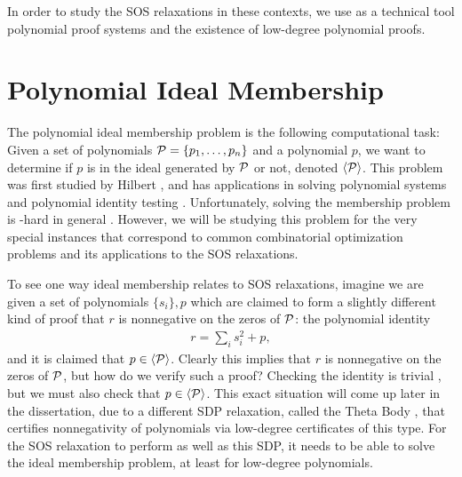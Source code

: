 In order to study the SOS relaxations in these contexts, we use as a technical tool polynomial proof systems and the existence of low-degree polynomial proofs.

\section{Polynomial Ideal Membership}

The polynomial ideal membership problem is the following computational task:
Given a set of polynomials $\mathcal P = \{p_1,\dots,p_n\}$ and a polynomial $p$, we want to determine if $p$ is in the ideal generated by $\mathcal P$ or not, denoted $\langle \mathcal P \rangle$.
This problem was first studied by Hilbert \cite{Hilbert1893}, and has applications in solving polynomial systems \cite{CLO07} and polynomial identity testing \cite{AM10}.
Unfortunately, solving the membership problem is \expspace-hard in general \cite{MM82,Huynh1985}.
However, we will be studying this problem for the very special instances that correspond to common combinatorial optimization problems and its applications to the SOS relaxations.

To see one way ideal membership relates to SOS relaxations, imagine we are given a set of polynomials $\{s_i\}, p$ which are claimed to form a slightly different kind of proof  that $r$ is nonnegative on the zeros of $\mathcal P$: the polynomial identity
\begin{align}
r = \sum_i s_i^2 + p,
\end{align}
and it is claimed that $p \in \langle \mathcal P \rangle$. Clearly this implies that $r$ is nonnegative on the zeros of $\mathcal P$, but how do we verify such a proof? Checking the identity is trivial , but we must also check that $p \in \langle \mathcal P \rangle$.
This exact situation will come up later in the dissertation, due to a different SDP relaxation, called the Theta Body \cite{GPT10}, that certifies nonnegativity of polynomials via low-degree certificates of this type.
For the SOS relaxation to perform as well as this SDP, it needs to be able to solve the ideal membership problem, at least for low-degree polynomials.

